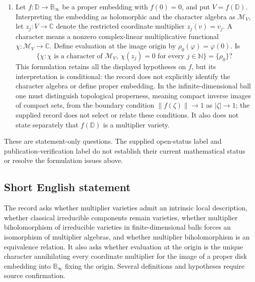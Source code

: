 \documentclass[11pt]{article}
\newcommand{\N}{\mathbb{N}}
\newcommand{\C}{\mathbb{C}}
\begin{document}
\begin{enumerate}
\item Let \(f:\mathbb D\to\mathbb B_\infty\) be a proper embedding with \(f(0)=0\), and put \(V=f(\mathbb D)\). Interpreting the embedding as holomorphic and the character algebra as \(\mathcal M_V\), let \(z_j:V\to\C\) denote the restricted coordinate multiplier \(z_j(v)=v_j\). A character means a nonzero complex-linear multiplicative functional \(\chi:\mathcal M_V\to\C\). Define evaluation at the image origin by \(\rho_0(\varphi)=\varphi(0)\). Is
\[
 \bigl\{\chi:\chi\text{ is a character of }\mathcal M_V,
       \ \chi(z_j)=0\text{ for every }j\in\N\bigr\}
 =\{\rho_0\}?
\]
This formulation retains all the displayed hypotheses on \(f\), but its interpretation is conditional: the record does not explicitly identify the character algebra or define proper embedding. In the infinite-dimensional ball one must distinguish topological properness, meaning compact inverse images of compact sets, from the boundary condition \(\|f(\zeta)\|\to1\) as \(|\zeta|\to1\); the supplied record does not select or relate these conditions. It also does not state separately that \(f(\mathbb D)\) is a multiplier variety.
\end{enumerate}

These are statement-only questions. The supplied open-status label and publication-verification label do not establish their current mathematical status or resolve the formulation issues above.
\subsection{Short English statement}
The record asks whether multiplier varieties admit an intrinsic local description, whether classical irreducible components remain varieties, whether multiplier biholomorphism of irreducible varieties in finite-dimensional balls forces an isomorphism of multiplier algebras, and whether multiplier biholomorphism is an equivalence relation. It also asks whether evaluation at the origin is the unique character annihilating every coordinate multiplier for the image of a proper disk embedding into \(\mathbb B_\infty\) fixing the origin. Several definitions and hypotheses require source confirmation.
\end{document}

